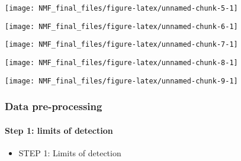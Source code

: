 \documentclass[
]{article}
\providecommand{\tightlist}{%
  \setlength{\itemsep}{0pt}\setlength{\parskip}{0pt}}
\begin{document}
\texttt{[image: NMF\_final\_files/figure-latex/unnamed-chunk-5-1]}

\texttt{[image: NMF\_final\_files/figure-latex/unnamed-chunk-6-1]}

\texttt{[image: NMF\_final\_files/figure-latex/unnamed-chunk-7-1]}

\texttt{[image: NMF\_final\_files/figure-latex/unnamed-chunk-8-1]}

\texttt{[image: NMF\_final\_files/figure-latex/unnamed-chunk-9-1]}

\subsubsection{Data pre-processing}\label{data-pre-processing}

\paragraph{Step 1: limits of
detection}\label{step-1-limits-of-detection}

\begin{itemize}
\tightlist
\item
  STEP 1: Limits of detection
\end{itemize}
\end{document}
